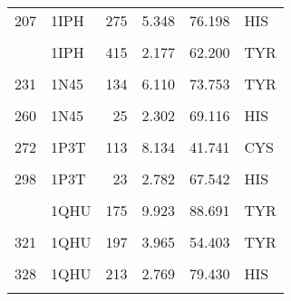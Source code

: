 \begin{table}
\begin{tabular}{llrrrl}
			207 & 1IPH & 275 & 5.348 & 76.198 & HIS\\
			\cellcolor{gray!6}{213} & \cellcolor{gray!6}{1IPH} & \cellcolor{gray!6}{392} & \cellcolor{gray!6}{7.521} & \cellcolor{gray!6}{56.309} & \cellcolor{gray!6}{HIS}\\
			\addlinespace
			223 & 1IPH & 415 & 2.177 & 62.200 & TYR\\
			\cellcolor{gray!6}{229} & \cellcolor{gray!6}{1N45} & \cellcolor{gray!6}{114} & \cellcolor{gray!6}{10.393} & \cellcolor{gray!6}{54.942} & \cellcolor{gray!6}{TYR}\\
			231 & 1N45 & 134 & 6.110 & 73.753 & TYR\\
			\cellcolor{gray!6}{234} & \cellcolor{gray!6}{1N45} & \cellcolor{gray!6}{137} & \cellcolor{gray!6}{7.892} & \cellcolor{gray!6}{81.032} & \cellcolor{gray!6}{TYR}\\
			260 & 1N45 & 25 & 2.302 & 69.116 & HIS\\
			\addlinespace
			\cellcolor{gray!6}{271} & \cellcolor{gray!6}{1P3T} & \cellcolor{gray!6}{112} & \cellcolor{gray!6}{6.840} & \cellcolor{gray!6}{67.730} & \cellcolor{gray!6}{TYR}\\
			272 & 1P3T & 113 & 8.134 & 41.741 & CYS\\
			\cellcolor{gray!6}{295} & \cellcolor{gray!6}{1P3T} & \cellcolor{gray!6}{184} & \cellcolor{gray!6}{3.832} & \cellcolor{gray!6}{79.193} & \cellcolor{gray!6}{TYR}\\
			298 & 1P3T & 23 & 2.782 & 67.542 & HIS\\
			\cellcolor{gray!6}{312} & \cellcolor{gray!6}{1P3T} & \cellcolor{gray!6}{53} & \cellcolor{gray!6}{9.402} & \cellcolor{gray!6}{65.300} & \cellcolor{gray!6}{HIS}\\
			\addlinespace
			316 & 1QHU & 175 & 9.923 & 88.691 & TYR\\
			\cellcolor{gray!6}{317} & \cellcolor{gray!6}{1QHU} & \cellcolor{gray!6}{176} & \cellcolor{gray!6}{5.915} & \cellcolor{gray!6}{62.683} & \cellcolor{gray!6}{TYR}\\
			321 & 1QHU & 197 & 3.965 & 54.403 & TYR\\
			\cellcolor{gray!6}{324} & \cellcolor{gray!6}{1QHU} & \cellcolor{gray!6}{204} & \cellcolor{gray!6}{5.533} & \cellcolor{gray!6}{47.589} & \cellcolor{gray!6}{TYR}\\
			328 & 1QHU & 213 & 2.769 & 79.430 & HIS\\
			\addlinespace
			\cellcolor{gray!6}{331} & \cellcolor{gray!6}{1QHU} & \cellcolor{gray!6}{222} & \cellcolor{gray!6}{6.023} & \cellcolor{gray!6}{77.401} & \cellcolor{gray!6}{HIS}\\

\end{tabular}
\end{table}
